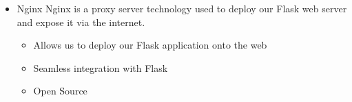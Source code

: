 \begin{itemize}
			\item Nginx
			Nginx is a proxy server technology used to deploy our Flask web server and expose it via the internet.
			\begin{itemize}
				\item Allows us to deploy our Flask application onto the web
				\item Seamless integration with Flask
				\item Open Source
			\end{itemize}

		\end{itemize}